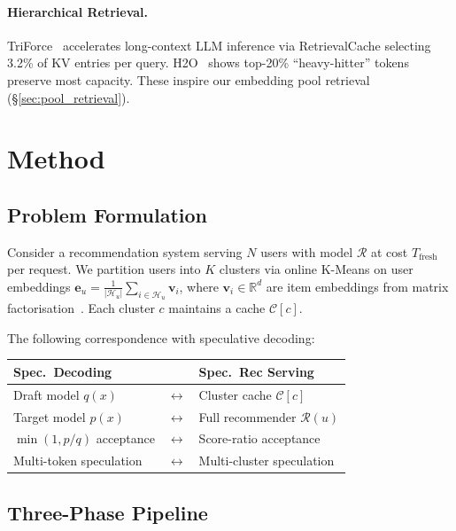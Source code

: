 \documentclass[sigconf,nonacm=false]{acmart}
\begin{document}
\paragraph{Hierarchical Retrieval.}
TriForce~\cite{triforce2024} accelerates long-context LLM inference via RetrievalCache selecting 3.2\% of KV entries per query. H2O~\cite{h2o2023} shows top-20\% ``heavy-hitter'' tokens preserve most capacity. These inspire our embedding pool retrieval (\S\ref{sec:pool_retrieval}).

\section{Method}
\label{sec:method}

\subsection{Problem Formulation}

Consider a recommendation system serving $N$ users with model $\mathcal{R}$ at cost $T_{\text{fresh}}$ per request. We partition users into $K$ clusters via online K-Means on user embeddings $\mathbf{e}_u = \frac{1}{|\mathcal{H}_u|} \sum_{i \in \mathcal{H}_u} \mathbf{v}_i$, where $\mathbf{v}_i \in \mathbb{R}^d$ are item embeddings from matrix factorisation~\cite{koren2009matrix}. Each cluster $c$ maintains a cache $\mathcal{C}[c]$.

The following correspondence with speculative decoding:
\begin{center}
\small
\begin{tabular}{lll}
\toprule
\textbf{Spec.\ Decoding} & & \textbf{Spec.\ Rec Serving} \\
\midrule
Draft model $q(x)$ & $\leftrightarrow$ & Cluster cache $\mathcal{C}[c]$ \\
Target model $p(x)$ & $\leftrightarrow$ & Full recommender $\mathcal{R}(u)$ \\
$\min(1, p/q)$ acceptance & $\leftrightarrow$ & Score-ratio acceptance \\
Multi-token speculation & $\leftrightarrow$ & Multi-cluster speculation \\
\bottomrule
\end{tabular}
\end{center}

\subsection{Three-Phase Pipeline}
\end{document}
